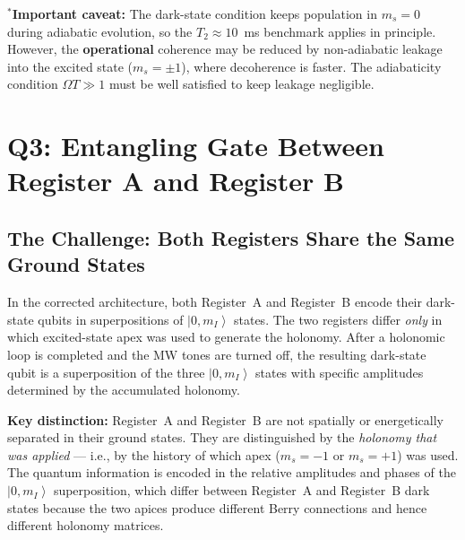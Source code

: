 \documentclass[11pt,letterpaper]{article}
\newcommand{\ket}[1]{\left|#1\right\rangle}
\begin{document}
\noindent $^*$\textbf{Important caveat:} The dark-state condition keeps population in $m_s = 0$ during adiabatic evolution, so the $T_2 \approx 10$~ms benchmark applies in principle. However, the \textbf{operational} coherence may be reduced by non-adiabatic leakage into the excited state ($m_s = \pm 1$), where decoherence is faster. The adiabaticity condition $\Omega T \gg 1$ must be well satisfied to keep leakage negligible.

\medskip
\noindent{}

\section{Q3: Entangling Gate Between Register A and Register B}
\label{sec:q3}

\subsection{The Challenge: Both Registers Share the Same Ground States}

In the corrected architecture, both Register~A and Register~B encode their dark-state qubits in superpositions of $\ket{0, m_I}$ states. The two registers differ \emph{only} in which excited-state apex was used to generate the holonomy. After a holonomic loop is completed and the MW tones are turned off, the resulting dark-state qubit is a superposition of the three $\ket{0, m_I}$ states with specific amplitudes determined by the accumulated holonomy.

\medskip
\noindent\textbf{Key distinction:} Register~A and Register~B are not spatially or energetically separated in their ground states. They are distinguished by the \emph{holonomy that was applied} --- i.e., by the history of which apex ($m_s = -1$ or $m_s = +1$) was used. The quantum information is encoded in the relative amplitudes and phases of the $\ket{0, m_I}$ superposition, which differ between Register~A and Register~B dark states because the two apices produce different Berry connections and hence different holonomy matrices.
\end{document}
